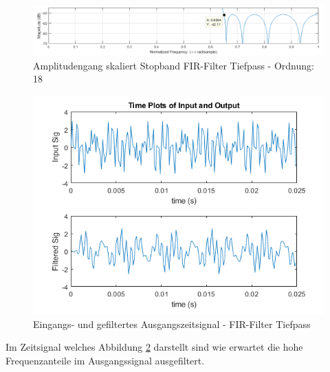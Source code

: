 \begin{figure}[H]
	\centering
	\includegraphics[width=1.0\linewidth]{Bilder/Attachment_A2_fir_2b_Amplitudengang_StopBand_19K}
	\caption{Amplitudengang skaliert Stopband FIR-Filter Tiefpass - Ordnung: 18}
	\label{fig:Attachment_A2_fir_2b_Amplitudengang_StopBand_19K}
\end{figure}



\newpage


\begin{figure}[H]
\centering
\includegraphics[width=0.85\linewidth]{./Bilder/Attachment_A2_fir_2b_Timeplot}
\caption{Eingangs- und gefiltertes Ausgangszeitsignal  - FIR-Filter Tiefpass}
\label{fig:Attachment_A2_fir_2b_Timeplot}
\end{figure}

\noindent Im Zeitsignal welches Abbildung \ref{fig:Attachment_A2_fir_2b_Timeplot} darstellt sind wie erwartet die hohe Frequenzanteile im Ausgangssignal ausgefiltert.

